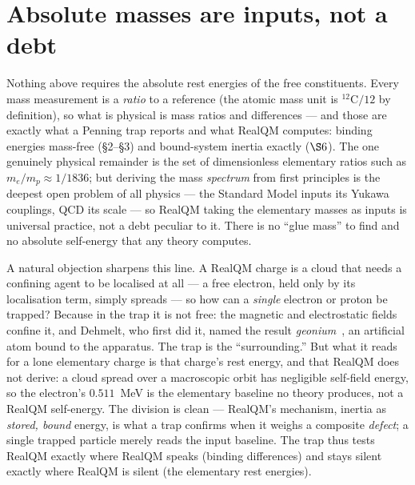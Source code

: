 \documentclass[11pt]{article}
\begin{document}
\section{Absolute masses are inputs, not a debt}
Nothing above requires the absolute rest energies of the free constituents. Every mass measurement is a
\emph{ratio} to a reference (the atomic mass unit is $^{12}\mathrm C/12$ by definition), so what is physical is
mass ratios and differences --- and those are exactly what a Penning trap reports and what RealQM computes:
binding energies mass-free (\S2--\S3) and bound-system inertia exactly ($\S6$). The one genuinely physical
remainder is the set of dimensionless elementary ratios such as $m_e/m_p\approx 1/1836$; but deriving the mass
\emph{spectrum} from first principles is the deepest open problem of all physics --- the Standard Model inputs its
Yukawa couplings, QCD its scale --- so RealQM taking the elementary masses as inputs is universal practice, not a
debt peculiar to it. There is no ``glue mass'' to find and no absolute self-energy that any theory computes.

A natural objection sharpens this line. A RealQM charge is a cloud that needs a confining agent to be localised at
all --- a free electron, held only by its localisation term, simply spreads --- so how can a \emph{single}
electron or proton be trapped? Because in the trap it is not free: the magnetic and electrostatic fields confine
it, and Dehmelt, who first did it, named the result \emph{geonium}~\cite{Dehmelt}, an artificial atom bound to the apparatus. The
trap is the ``surrounding.'' But what it reads for a lone elementary charge is that charge's rest energy, and that
RealQM does not derive: a cloud spread over a macroscopic orbit has negligible self-field energy, so the electron's
$0.511$~MeV is the elementary baseline no theory produces, not a RealQM self-energy. The division is clean ---
RealQM's mechanism, inertia as \emph{stored, bound} energy, is what a trap confirms when it weighs a composite
\emph{defect}; a single trapped particle merely reads the input baseline. The trap thus tests RealQM exactly where
RealQM speaks (binding differences) and stays silent exactly where RealQM is silent (the elementary rest energies).
\end{document}
